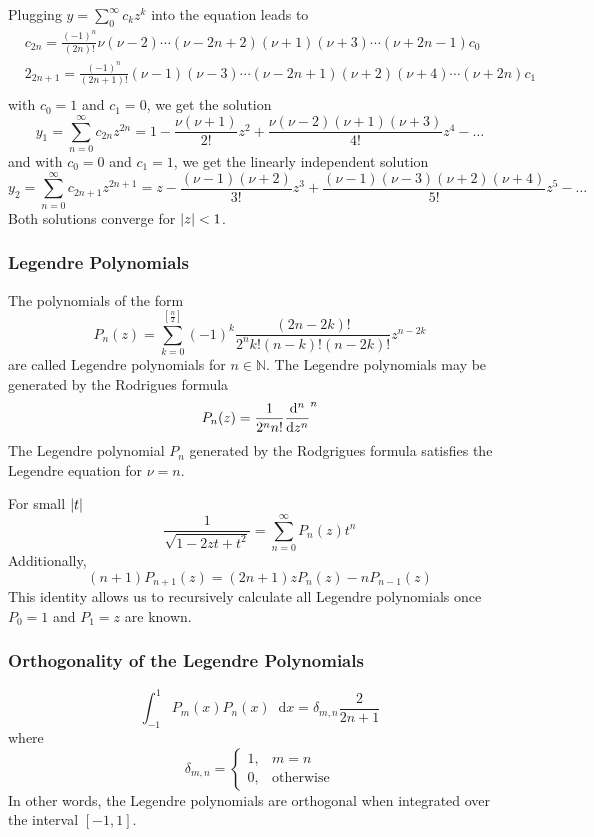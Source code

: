 \documentclass[11pt, a4paper]{article}
\newcommand{\diff}{\mathop{}\!\mathrm{d}} %
\begin{document}
Plugging $ \displaystyle{y = \sum_{0}^{\infty} c_k z^k} $ into the equation leads to
\begin{align*}
	&c_{2n} = \frac{(-1)^n}{(2n)!} \nu(\nu-2)\cdots(\nu - 2n + 2)(\nu + 1)(\nu + 3)\cdots(\nu + 2n -1)c_0\\
	&2_{2n+1} = \frac{(-1)^n}{(2n+1)!}(\nu-1)(\nu-3)\cdots(\nu - 2n + 1)(\nu+2)(\nu + 4)\cdots(\nu + 2n)c_1\\
\end{align*}
with $ c_0 = 1 $ and $ c_1 = 0 $, we get the solution 
\begin{equation*}
	y_1 = \sum_{n=0}^{\infty}c_{2n}z^{2n} = 1 - \frac{\nu(\nu+1)}{2!}z^2 + \frac{\nu(\nu-2)(\nu+1)(\nu+3)}{4!}z^4 - \dots
\end{equation*}
and with $ c_0 = 0 $ and $ c_1 = 1 $, we get the linearly independent solution
\begin{equation*}
	y_2 = \sum_{n=0}^{\infty}c_{2n+1}z^{2n+1} = z - \frac{(\nu-1)(\nu+2)}{3!}z^3 + \frac{(\nu-1)(\nu-3)(\nu+2)(\nu+4)}{5!}z^5 - \dots
\end{equation*}
Both solutions converge for $ \abs{z} < 1 $.

\subsubsection{Legendre Polynomials}
The polynomials of the form
\begin{equation*}
	P_n(z) = \sum_{k=0}^{[\frac{n}{2}]}(-1)^{k}\frac{(2n-2k)!}{2^nk!(n-k)!(n-2k)!}z^{n-2k}
\end{equation*}
are called Legendre polynomials for $ n \in \mathbb{N} $. The Legendre polynomials may be generated by the Rodrigues formula
\begin{equation*}
	P_n(z) = \frac{1}{2^nn!}\dv[n]{}{z}(z^2 - 1)^n
\end{equation*}
The Legendre polynomial $ P_n $ generated by the Rodgrigues formula satisfies the Legendre equation for $ \nu = n $.

For small $ \abs{t} $
\begin{equation*}
	\frac{1}{\sqrt{1-2zt+t^2}} = \sum_{n=0}^{\infty}P_n(z)t^n
\end{equation*}
Additionally,
\begin{equation*}
	(n+1)P_{n+1}(z) = (2n+1)zP_n(z) - nP_{n-1}(z)
\end{equation*}
This identity allows us to recursively calculate all Legendre polynomials once $ P_0 = 1 $ and $ P_1 = z $ are known.

\subsubsection{Orthogonality of the Legendre Polynomials}
\begin{equation*}
	\int_{-1}^{1}P_m(x)P_n(x) \diff x = \delta_{m, n}\frac{2}{2n+1}
\end{equation*}
where
\[
	\delta_{m, n} = \begin{cases}
		1, & m = n\\
		0, & \text{otherwise}
	\end{cases}
\]
In other words, the Legendre polynomials are orthogonal when integrated over the interval $ [-1, 1] $.
\end{document}
